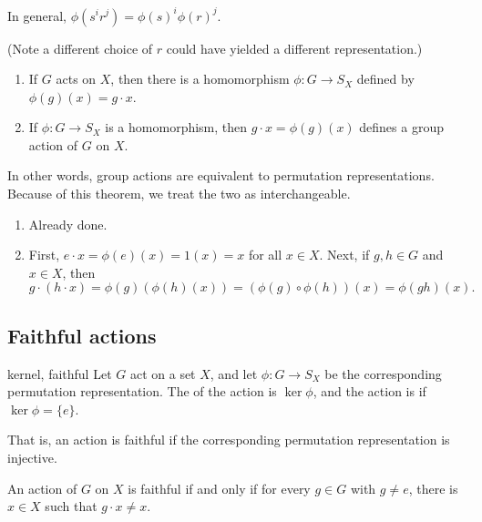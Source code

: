 \documentclass[12pt,letterpaper]{report}
\begin{document}
In general, $\phi(s^i r^j) = \phi(s)^i \phi(r)^j$.

(Note a different choice of $r$ could have yielded a different representation.)

\begin{thm}{}{}
  \begin{enumerate}
    \item If $G$ acts on $X$, then there is a homomorphism $\phi \colon G \to S_X$ defined by
      $\phi(g)(x) = g \cdot x$.
    \item If $\phi \colon G \to S_X$ is a homomorphism, then $g \cdot x = \phi(g)(x)$ defines a
      group action of $G$ on $X$.
  \end{enumerate}
\end{thm}

In other words, group actions are equivalent to permutation representations.
Because of this theorem, we treat the two as interchangeable.

\begin{thmproof}
  \begin{enumerate}
    \item Already done.
    \item First, $e \cdot x = \phi(e)(x) = 1(x) = x$ for all $x \in X$.
    Next, if $g, h \in G$ and $x \in X$, then
    \[ g \cdot (h \cdot x) = \phi(g)(\phi(h)(x)) = (\phi(g) \circ \phi(h))(x) = \phi(gh)(x). \]
  \end{enumerate}
\end{thmproof}

\pagebreak
\subsection{Faithful actions}

\begin{defn}{kernel, faithful}{}
  Let $G$ act on a set $X$, and let $\phi \colon G \to S_X$ be the corresponding permutation
  representation.
  The  of the action is $\ker \phi$, and the action is  if
  $\ker\phi = \{e\}$.
\end{defn}

That is, an action is faithful if the corresponding permutation representation is injective.

\begin{lem}{}{}
  An action of $G$ on $X$ is faithful if and only if for every $g \in G$ with $g \neq e$, there is
  $x \in X$ such that $g \cdot x \neq x$.
\end{lem}
\end{document}
